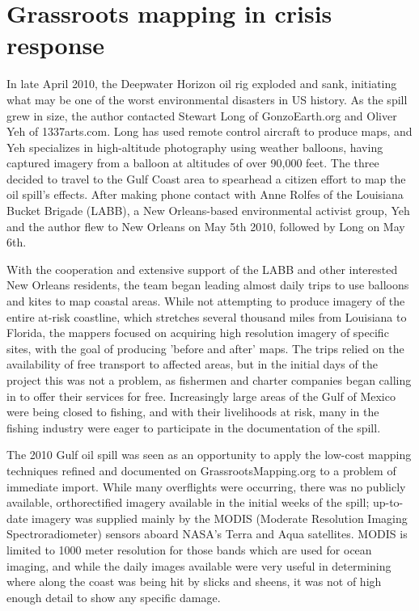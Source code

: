 \documentclass[11pt]{report}
\begin{document}
\section{Grassroots mapping in crisis response}

In late April 2010, the Deepwater Horizon oil rig exploded and sank, initiating what may be one of the worst environmental disasters in US history. As the spill grew in size, the author contacted Stewart Long of GonzoEarth.org and Oliver Yeh of 1337arts.com. Long has used remote control aircraft to produce maps, and Yeh specializes in high-altitude photography using weather balloons, having captured imagery from a balloon at altitudes of over 90,000 feet. The three decided to travel to the Gulf Coast area to spearhead a citizen effort to map the oil spill's effects. After making phone contact with Anne Rolfes of the Louisiana Bucket Brigade (LABB), a New Orleans-based environmental activist group, Yeh and the author flew to New Orleans on May 5th 2010, followed by Long on May 6th. 

With the cooperation and extensive support of the LABB and other interested New Orleans residents, the team began leading almost daily trips to use balloons and kites to map coastal areas. While not attempting to produce imagery of the entire at-risk coastline, which stretches several thousand miles from Louisiana to Florida, the mappers focused on acquiring high resolution imagery of specific sites, with the goal of producing 'before and after' maps. The trips relied on the availability of free transport to affected areas, but in the initial days of the project this was not a problem, as fishermen and charter companies began calling in to offer their services for free. Increasingly large areas of the Gulf of Mexico were being closed to fishing, and with their livelihoods at risk, many in the fishing industry were eager to participate in the documentation of the spill. 


The 2010 Gulf oil spill was seen as an opportunity to apply the low-cost mapping techniques refined and documented on GrassrootsMapping.org to a problem of immediate import. While many overflights were occurring, there was no publicly available, orthorectified imagery available in the initial weeks of the spill; up-to-date imagery was supplied mainly by the MODIS (Moderate Resolution Imaging Spectroradiometer) sensors aboard NASA's Terra and Aqua satellites. MODIS is limited to 1000 meter resolution for those bands which are used for ocean imaging, and while the daily images available were very useful in determining where along the coast was being hit by slicks and sheens, it was not of high enough detail to show any specific damage. 
\end{document}
